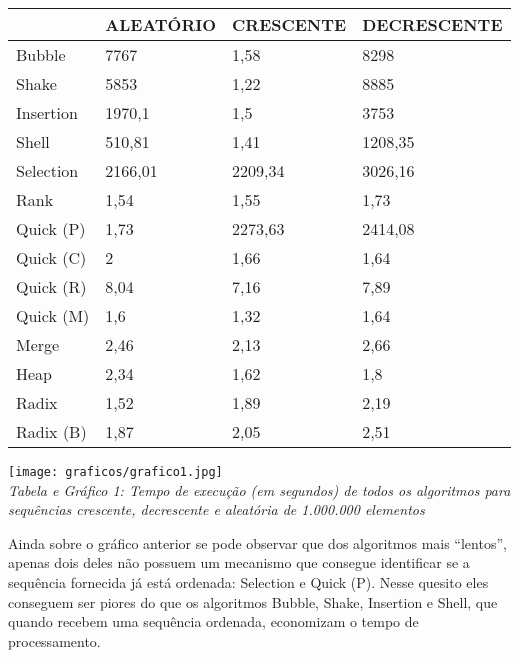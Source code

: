 \documentclass[12pt,a4paper]{article}
\begin{document}
\begin{center}
\begin{table}[!h]
\centering
\label{my-label}
\begin{tabular}{llll}
\hline
          & ALEATÓRIO & CRESCENTE & DECRESCENTE \\ \hline
Bubble    & 7767      & 1,58      & 8298        \\
Shake     & 5853      & 1,22      & 8885        \\
Insertion & 1970,1    & 1,5       & 3753        \\
Shell     & 510,81    & 1,41      & 1208,35     \\
Selection & 2166,01   & 2209,34   & 3026,16     \\
Rank      & 1,54      & 1,55      & 1,73        \\
Quick (P) & 1,73      & 2273,63   & 2414,08     \\
Quick (C) & 2         & 1,66      & 1,64        \\
Quick (R) & 8,04      & 7,16      & 7,89        \\
Quick (M) & 1,6       & 1,32      & 1,64        \\
Merge     & 2,46      & 2,13      & 2,66        \\
Heap      & 2,34      & 1,62      & 1,8         \\
Radix     & 1,52      & 1,89      & 2,19        \\
Radix (B) & 1,87      & 2,05      & 2,51        \\ \hline
\end{tabular}
\end{table}
\end{center}


\begin{center}
\texttt{[image: graficos/grafico1.jpg]}\\
\textit{Tabela e Gráfico 1: Tempo de execução (em segundos) de todos os algoritmos para sequências crescente, decrescente e aleatória de 1.000.000 elementos}
\end{center}



Ainda sobre o gráfico anterior se pode observar que dos algoritmos mais “lentos”, apenas dois deles não possuem um mecanismo que consegue identificar se a sequência fornecida já está ordenada: Selection e Quick (P). Nesse quesito eles conseguem ser piores do que os algoritmos Bubble, Shake, Insertion e Shell, que quando recebem uma sequência ordenada, economizam o tempo de processamento. 
\end{document}
